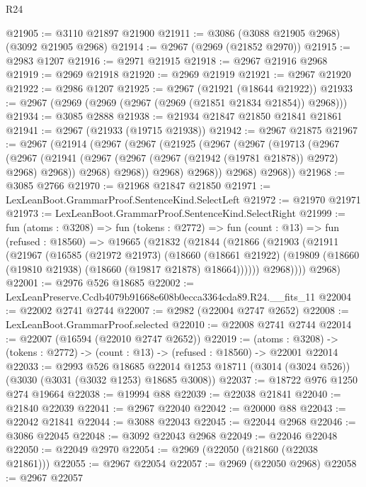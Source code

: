 \begin{lexlean}{R24}
\begin{coremodule}
@21905 := @3110 @21897 @21900
@21911 := @3086 (@3088 @21905 @2968) (@3092 @21905 @2968)
@21914 := @2967 (@2969 (@21852 @2970))
@21915 := @2983 @1207
@21916 := @2971 @21915
@21918 := @2967 @21916 @2968
@21919 := @2969 @21918
@21920 := @2969 @21919
@21921 := @2967 @21920
@21922 := @2986 @1207
@21925 := @2967 (@21921 (@18644 @21922))
@21933 := @2967 (@2969 (@2969 (@2967 (@2969 (@21851 @21834 @21854)) @2968)))
@21934 := @3085 @2888
@21938 := @21934 @21847 @21850 @21841 @21861
@21941 := @2967 (@21933 (@19715 @21938))
@21942 := @2967 @21875
@21967 := @2967
    (@21914
      (@2967
        (@2967
          (@21925
            (@2967
              (@2967
                (@19713
                  (@2967
                    (@2967
                      (@21941 (@2967 (@2967 (@2967 (@21942 (@19781 @21878)) @2972) @2968) @2968))
                      @2968)
                    @2968))
                @2968)
              @2968))
          @2968)
        @2968))
@21968 := @3085 @2766
@21970 := @21968 @21847 @21850
@21971 := LexLeanBoot.GrammarProof.SentenceKind.SelectLeft
@21972 := @21970 @21971
@21973 := LexLeanBoot.GrammarProof.SentenceKind.SelectRight
@21999 := fun (atoms : @3208) =>
  fun (tokens : @2772) =>
  fun (count : @13) =>
  fun (refused : @18560) =>
  @19665
    (@21832
      (@21844
        (@21866
          (@21903
            (@21911
              (@21967
                (@16585
                  (@21972 @21973)
                  (@18660
                    (@18661 @21922)
                    (@19809 (@18660 (@19810 @21938) (@18660 (@19817 @21878) @18664))))))
              @2968))))
      @2968)
@22001 := @2976 @526 @18685
@22002 := LexLeanPreserve.Ccdb4079b91668e608b0ecca3364cda89.R24.__fits_11
@22004 := @22002 @2741 @2744
@22007 := @2982 (@22004 @2747 @2652)
@22008 := LexLeanBoot.GrammarProof.selected
@22010 := @22008 @2741 @2744
@22014 := @22007 (@16594 (@22010 @2747 @2652))
@22019 := (atoms : @3208) ->
  (tokens : @2772) -> (count : @13) -> (refused : @18560) -> @22001 @22014
@22033 := @2993
    @526
    @18685
    @22014
    @1253
    @18711
    (@3014 (@3024 @526))
    (@3030 (@3031 (@3032 @1253) @18685 @3008))
@22037 := @18722 @976 @1250 @274 @19664
@22038 := @19994 @88
@22039 := @22038 @21841
@22040 := @21840 @22039
@22041 := @2967 @22040
@22042 := @20000 @88
@22043 := @22042 @21841
@22044 := @3088 @22043
@22045 := @22044 @2968
@22046 := @3086 @22045
@22048 := @3092 @22043 @2968
@22049 := @22046 @22048
@22050 := @22049 @2970
@22054 := @2969 (@22050 (@21860 (@22038 @21861)))
@22055 := @2967 @22054
@22057 := @2969 (@22050 @2968)
@22058 := @2967 @22057

\end{coremodule}
\end{lexlean}
